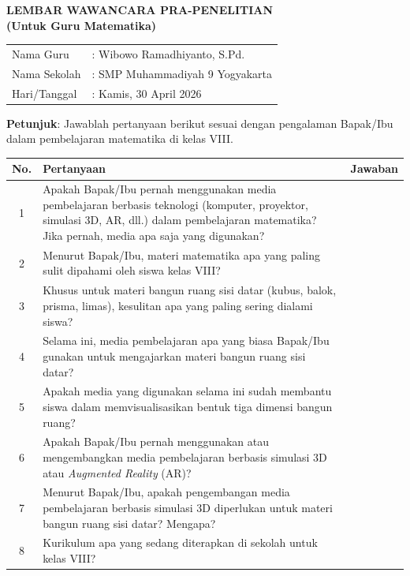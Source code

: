 \newpage
\begin{center}
    {\large\bfseries LEMBAR WAWANCARA PRA-PENELITIAN}\\
    \vspace{0.2cm}
    {\bfseries (Untuk Guru Matematika)}
\end{center}

\vspace{0.5cm}

\begin{table}[H]
    \begin{tabular}{@{}ll@{}}
        Nama Guru      & : Wibowo Ramadhiyanto, S.Pd. \\
        Nama Sekolah   & : SMP Muhammadiyah 9 Yogyakarta \\
        Hari/Tanggal   & : Kamis, 30 April 2026 \\
    \end{tabular}
\end{table}

\vspace{0.3cm}

\noindent \textbf{Petunjuk}: Jawablah pertanyaan berikut sesuai dengan pengalaman Bapak/Ibu dalam pembelajaran matematika di kelas VIII.

\vspace{0.3cm}

\begin{longtable}{|c|p{8cm}|p{6cm}|}
    \hline
    \textbf{No.} & \textbf{Pertanyaan} & \textbf{Jawaban} \\
    \hline
    1 & Apakah Bapak/Ibu pernah menggunakan media pembelajaran berbasis teknologi (komputer, proyektor, simulasi 3D, AR, dll.) dalam pembelajaran matematika? Jika pernah, media apa saja yang digunakan? & \\
    \hline
    2 & Menurut Bapak/Ibu, materi matematika apa yang paling sulit dipahami oleh siswa kelas VIII? &  \\
    \hline
    3 & Khusus untuk materi bangun ruang sisi datar (kubus, balok, prisma, limas), kesulitan apa yang paling sering dialami siswa? & \\
    \hline
    4 & Selama ini, media pembelajaran apa yang biasa Bapak/Ibu gunakan untuk mengajarkan materi bangun ruang sisi datar? &  \\
    \hline
    5 & Apakah media yang digunakan selama ini sudah membantu siswa dalam memvisualisasikan bentuk tiga dimensi bangun ruang? & \\
    \hline
    6 & Apakah Bapak/Ibu pernah menggunakan atau mengembangkan media pembelajaran berbasis simulasi 3D atau \textit{Augmented Reality} (AR)? &  \\
    \hline
    7 & Menurut Bapak/Ibu, apakah pengembangan media pembelajaran berbasis simulasi 3D diperlukan untuk materi bangun ruang sisi datar? Mengapa? &  \\
    \hline
    8 & Kurikulum apa yang sedang diterapkan di sekolah untuk kelas VIII? & \\
    \hline
\end{longtable}

